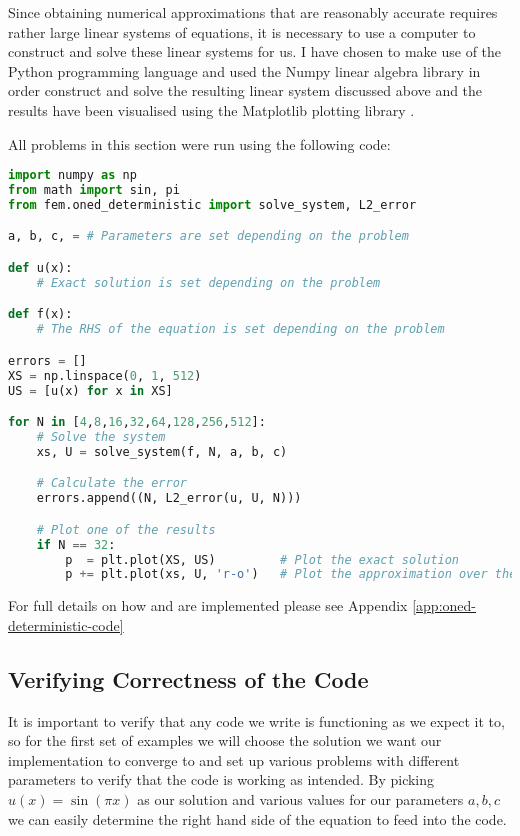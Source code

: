 
Since obtaining numerical approximations that are reasonably accurate requires
rather large linear systems of equations, it is necessary to use a computer to
construct and solve these linear systems for us.  I have chosen to make use of
the Python programming language and used the Numpy linear algebra library
\cite{numpy-array} in order construct and solve the resulting linear system
discussed above  and the results have been
visualised using the Matplotlib plotting library \cite{matplotlib}.

All problems in this section were run using the following code:

\begin{lstlisting}[language=Python]
import numpy as np
from math import sin, pi
from fem.oned_deterministic import solve_system, L2_error

a, b, c, = # Parameters are set depending on the problem

def u(x):
    # Exact solution is set depending on the problem

def f(x):
    # The RHS of the equation is set depending on the problem

errors = []
XS = np.linspace(0, 1, 512)
US = [u(x) for x in XS]

for N in [4,8,16,32,64,128,256,512]:
    # Solve the system
    xs, U = solve_system(f, N, a, b, c)

    # Calculate the error
    errors.append((N, L2_error(u, U, N)))

    # Plot one of the results
    if N == 32:
        p  = plt.plot(XS, US)         # Plot the exact solution
        p += plt.plot(xs, U, 'r-o')   # Plot the approximation over the top
\end{lstlisting}\label{code:oned-deterministic}

For full details on how  and  are
implemented please see Appendix \ref{app:oned-deterministic-code}

\subsection{Verifying Correctness of the Code}

It is important to verify that any code we write is functioning as we expect it
to, so for the first set of examples we will choose the solution we want our
implementation to converge to and set up various problems with different
parameters to verify that the code is working as intended. By picking $u(x) =
\sin{(\pi x)}$ as our solution and various values for our parameters $a,b,c$ we
can easily determine the right hand side of the equation to feed into the code.

